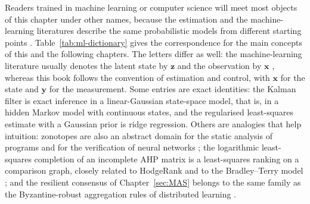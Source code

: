 Readers trained in machine learning or computer science will meet most objects of this chapter under other names, because the estimation and the machine-learning literatures describe the same probabilistic models from different starting points \cite{bishop2006_prml,koller2009_pgm,sarkka2013_bayesian}. Table~\ref{tab:ml-dictionary} gives the correspondence for the main concepts of this and the following chapters. The letters differ as well: the machine-learning literature usually denotes the latent state by $\mathbf{z}$ and the observation by $\mathbf{x}$ \cite{bishop2006_prml}, whereas this book follows the convention of estimation and control, with $\mathbf{x}$ for the state and $\mathbf{y}$ for the measurement. Some entries are exact identities: the Kalman filter is exact inference in a linear-Gaussian state-space model, that is, in a hidden Markov model with continuous states, and the regularised least-squares estimate with a Gaussian prior is ridge regression. Others are analogies that help intuition: zonotopes are also an abstract domain for the static analysis of programs and for the verification of neural networks \cite{ghorbal2009_zonotope,gehr2018_ai2}; the logarithmic least-squares completion of an incomplete AHP matrix is a least-squares ranking on a comparison graph, closely related to HodgeRank and to the Bradley--Terry model \cite{jiang2011_hodgerank,bradley1952_paired}; and the resilient consensus of Chapter~\ref{sec:MAS} belongs to the same family as the Byzantine-robust aggregation rules of distributed learning \cite{yin2018_byzantine}.


